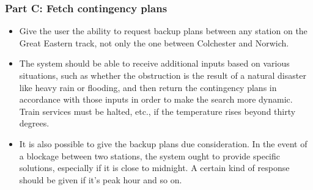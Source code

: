 \subsubsection{Part C: Fetch contingency plans}
\begin{itemize}
    \item Give the user the ability to request backup plans between any station on the Great Eastern track, not only the one between Colchester and Norwich.
    \item The system should be able to receive additional inputs based on various situations, such as whether the obstruction is the result of a natural disaster like heavy rain or flooding, and then return the contingency plans in accordance with those inputs in order to make the search more dynamic. Train services must be halted, etc., if the temperature rises beyond thirty degrees.
    \item It is also possible to give the backup plans due consideration. In the event of a blockage between two stations, the system ought to provide specific solutions, especially if it is close to midnight. A certain kind of response should be given if it's peak hour and so on.
\end{itemize}